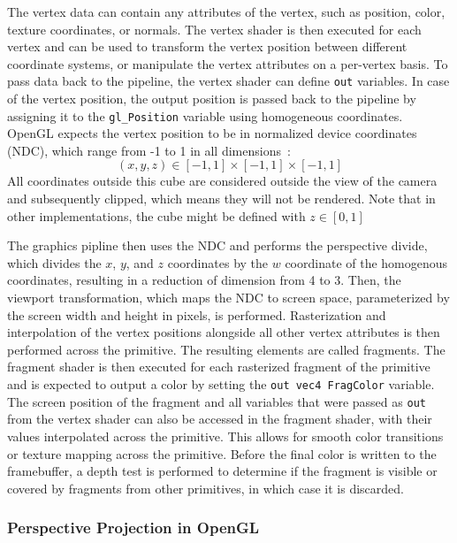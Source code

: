 The vertex data can contain any attributes of the vertex, such as position, color, texture coordinates, or normals.
The vertex shader is then executed for each vertex and can be used to transform the vertex position between different coordinate systems,
or manipulate the vertex attributes on a per-vertex basis.
To pass data back to the pipeline, the vertex shader can define \texttt{out} variables.
In case of the vertex position, the output position is passed back to the
pipeline by assigning it to the \texttt{gl\_Position} variable using homogeneous coordinates.
OpenGL expects the vertex position to be in normalized device coordinates (NDC),
which range from -1 to 1 in all dimensions~\cite{dorner_virtual_2019}:
\begin{equation}
    (x, y, z) \in [-1, 1] \times [-1, 1] \times [-1, 1]
\end{equation}
All coordinates outside this cube are considered outside the view of the camera and subsequently clipped,
which means they will not be rendered.
Note that in other implementations, the cube might be defined with $z \in [0, 1]$~\cite{dorner_virtual_2019}

The graphics pipline then uses the NDC and performs the perspective divide,
which divides the $x$, $y$, and $z$ coordinates by the $w$ coordinate of the homogenous coordinates,
resulting in a reduction of dimension from 4 to 3.
Then, the viewport transformation, which maps the NDC to screen space,
parameterized by the screen width and height in pixels, is performed.
Rasterization and interpolation of the vertex positions alongside all other vertex attributes
is then performed across the primitive.
The resulting elements are called fragments.
The fragment shader is then executed for each rasterized fragment of the primitive and is expected to
output a color by setting the \texttt{out vec4 FragColor} variable.
The screen position of the fragment and all variables that were passed as \texttt{out} from the
vertex shader can also be accessed in the fragment shader, with their values interpolated across the primitive.
This allows for smooth color transitions or texture mapping across the primitive.
Before the final color is written to the framebuffer,
a depth test is performed to determine if the fragment is visible or covered by fragments from other primitives,
in which case it is discarded.~\cite{de_vries_learn_2020}


\subsubsection{Perspective Projection in OpenGL}

